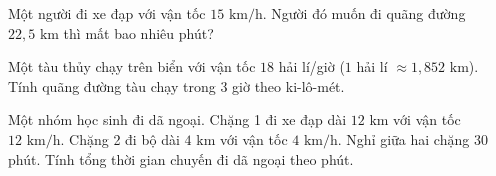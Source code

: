 \begin{ex} %
Một người đi xe đạp với vận tốc $15\text{ km/h}$. Người đó muốn đi quãng đường $22{,}5\text{ km}$ thì mất bao nhiêu phút?
\end{ex}

\begin{ex} %
Một tàu thủy chạy trên biển với vận tốc $18$ hải lí/giờ ($1$ hải lí $\approx 1{,}852\text{ km}$). Tính quãng đường tàu chạy trong $3$ giờ theo ki-lô-mét.
\end{ex}

\begin{ex} %
Một nhóm học sinh đi dã ngoại. Chặng 1 đi xe đạp dài $12\text{ km}$ với vận tốc $12\text{ km/h}$. Chặng 2 đi bộ dài $4\text{ km}$ với vận tốc $4\text{ km/h}$. Nghỉ giữa hai chặng $30$ phút. Tính tổng thời gian chuyến đi dã ngoại theo phút.
\end{ex}
